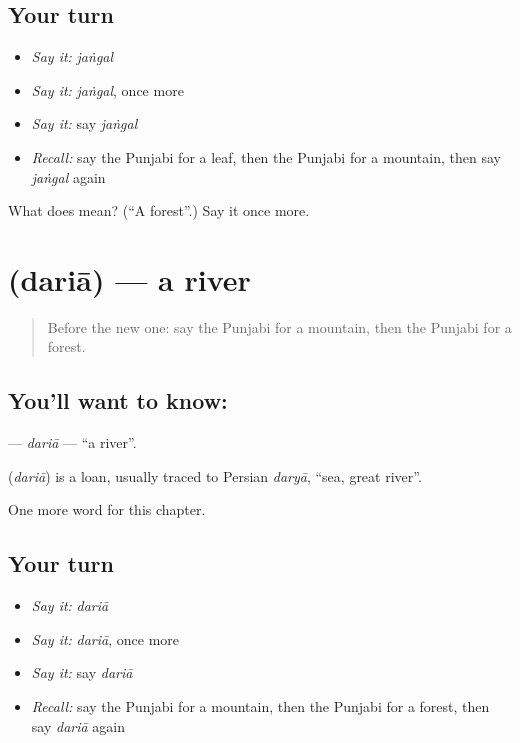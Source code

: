\subsection*{Your turn}
\begin{itemize}
\raggedright
  \item \emph{Say it:} \emph{jaṅgal}
  \item \emph{Say it:} \emph{jaṅgal}, once more
  \item \emph{Say it:} say \emph{jaṅgal}
  \item \emph{Recall:} say the Punjabi for a leaf, then the Punjabi for a mountain, then say \emph{jaṅgal} again
\end{itemize}

\begin{tcolorbox}[breakable,colback=teal!4,colframe=teal!35!black,title={Before you move on}]
What does  mean? (\textquotedblleft{}A forest\textquotedblright{}.) Say it once more.
\end{tcolorbox}
\section[\texorpdfstring{\pa{ਦਰਿਆ} (dariā)}{ਦਰਿਆ (dariā)}]{ (dariā) — a river}

\label{lesson:PA-C74-daria}



\begin{quote}
Before the new one: say the Punjabi for a mountain, then the Punjabi for a forest.
\end{quote}

\subsection*{You'll want to know: }
\textbf{} — \emph{dariā} — \textquotedblleft{}a river\textquotedblright{}.

\begin{cousinweb}
\textbf{} (\emph{dariā}) is a loan, usually traced to Persian \emph{daryā}, \textquotedblleft{}sea, great river\textquotedblright{}.
\end{cousinweb}

\begin{grammarlens}[title={What you've built}]
One more word for this chapter.
\end{grammarlens}

\subsection*{Your turn}
\begin{itemize}
\raggedright
  \item \emph{Say it:} \emph{dariā}
  \item \emph{Say it:} \emph{dariā}, once more
  \item \emph{Say it:} say \emph{dariā}
  \item \emph{Recall:} say the Punjabi for a mountain, then the Punjabi for a forest, then say \emph{dariā} again
\end{itemize}

